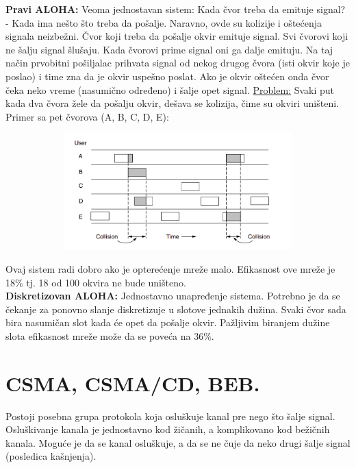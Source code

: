 \documentclass[a4paper]{article}
\begin{document}
        \textbf{Pravi ALOHA:} Veoma jednostavan sistem: Kada čvor treba da emituje signal? - Kada
        ima nešto što treba da pošalje. Naravno, ovde su kolizije i oštećenja signala neizbežni.
        Čvor koji treba da pošalje okvir emituje signal. Svi čvorovi koji ne šalju signal šlušaju.
        Kada čvorovi prime signal oni ga dalje emituju. Na taj način prvobitni pošiljalac 
        prihvata signal od nekog drugog čvora (isti okvir koje je poslao) i time zna
        da je okvir uspešno poslat. Ako je okvir oštećen onda čvor čeka neko vreme (nasumično
        određeno) i šalje opet signal. \underline{Problem:} Svaki put kada dva čvora žele da pošalju okvir,
        dešava se kolizija, čime su okviri uništeni. Primer sa pet čvorova (A, B, C, D, E):
        \begin{figure}[H]
            \begin{center}
                \includegraphics[width=120mm,height=45mm]{Slike/aloha1.png}
            \end{center}
        \end{figure}
        Ovaj sistem radi dobro ako je opterećenje mreže malo. Efikasnost ove mreže je 18\% tj.
        18 od 100 okvira ne bude uništeno. \\

        \textbf{Diskretizovan ALOHA:} Jednostavno unapređenje sistema. Potrebno je da se
        čekanje za ponovno slanje diskretizuje u slotove jednakih dužina. Svaki čvor sada
        bira nasumičan slot kada će opet da pošalje okvir. Pažljivim biranjem dužine slota
        efikasnost mreže može da se poveća na 36\%.

\section{CSMA, CSMA/CD, BEB. }
    Postoji posebna grupa protokola koja osluškuje kanal pre nego što šalje signal. Osluškivanje
    kanala je jednostavno kod žičanih, a komplikovano kod bežičnih kanala. Moguće je da
    se kanal osluškuje, a da se ne čuje da neko drugi šalje signal (posledica kašnjenja).
\end{document}
